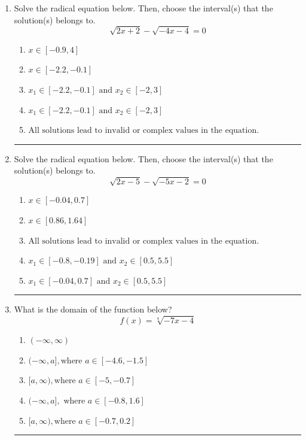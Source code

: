 \documentclass[14pt]{extbook}
\newcommand{\litem}[1]{\item#1\hspace*{-1cm}\rule{\textwidth}{0.4pt}}
\begin{document}
\begin{enumerate}
{\begin{enumerate}[label=\Alph*.]
\end{enumerate} }
\litem{
Solve the radical equation below. Then, choose the interval(s) that the solution(s) belongs to.\[ \sqrt{2 x + 2} - \sqrt{-4 x - 4} = 0 \]\begin{enumerate}[label=\Alph*.]
\item \( x \in [-0.9,4] \)
\item \( x \in [-2.2,-0.1] \)
\item \( x_1 \in [-2.2, -0.1] \text{ and } x_2 \in [-2,3] \)
\item \( x_1 \in [-2.2, -0.1] \text{ and } x_2 \in [-2,3] \)
\item \( \text{All solutions lead to invalid or complex values in the equation.} \)

\end{enumerate} }
\litem{
Solve the radical equation below. Then, choose the interval(s) that the solution(s) belongs to.\[ \sqrt{2 x - 5} - \sqrt{-5 x - 2} = 0 \]\begin{enumerate}[label=\Alph*.]
\item \( x \in [-0.04,0.7] \)
\item \( x \in [0.86,1.64] \)
\item \( \text{All solutions lead to invalid or complex values in the equation.} \)
\item \( x_1 \in [-0.8, -0.19] \text{ and } x_2 \in [0.5,5.5] \)
\item \( x_1 \in [-0.04, 0.7] \text{ and } x_2 \in [0.5,5.5] \)

\end{enumerate} }
\litem{
What is the domain of the function below?\[ f(x) = \sqrt[4]{-7 x - 4} \]\begin{enumerate}[label=\Alph*.]
\item \( (-\infty, \infty) \)
\item \( (-\infty, a], \text{where } a \in [-4.6, -1.5] \)
\item \( [a, \infty), \text{where } a \in [-5, -0.7] \)
\item \( (-\infty, a], \text{ where } a \in [-0.8, 1.6] \)
\item \( [a, \infty), \text{where } a \in [-0.7, 0.2] \)


\end{enumerate}}
\end{enumerate}
\end{document}
